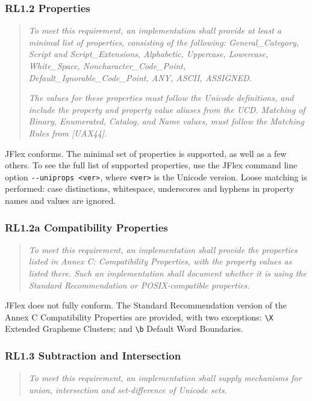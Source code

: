 \documentclass[11pt]{scrartcl}
\begin{document}
\subsubsection*{RL1.2 Properties}

\begin{quote}
\emph{To meet this requirement, an implementation shall provide at least a
minimal list of properties, consisting of the following: General\_Category,
Script and Script\_Extensions, Alphabetic, Uppercase, Lowercase, White\_Space,
Noncharacter\_Code\_Point, Default\_Ignorable\_Code\_Point, ANY, ASCII, ASSIGNED.}

\emph{The values for these properties must follow the Unicode definitions, 
and include the property and property value aliases from the UCD. Matching
of Binary, Enumerated, Catalog, and Name values, must follow the
Matching Rules from [UAX44].}
\end{quote}

JFlex conforms.  The minimal set of properties is supported, as well as
a few others. To see the full list of supported properties, use the JFlex
command line option \verb+--uniprops <ver>+, where \verb+<ver>+ is the
Unicode version.  Loose matching is performed: case distinctions, 
whitespace, underscores and hyphens in property names and values are
ignored.

\subsubsection*{RL1.2a Compatibility Properties}

\begin{quote}
\emph{To meet this requirement, an implementation shall provide the properties
listed in Annex C: Compatibility Properties, with the property values as
listed there. Such an implementation shall document whether it is using
the Standard Recommendation or POSIX-compatible properties.}
\end{quote}

JFlex does not fully conform. The Standard Recommendation version of the
Annex C Compatibility Properties are provided, with two exceptions:
\verb+\X+ Extended Grapheme Clusters; and \verb+\b+ Default Word
Boundaries.

\subsubsection*{RL1.3 Subtraction and Intersection}

\begin{quote}
\emph{To meet this requirement, an implementation shall supply mechanisms for
union, intersection and set-difference of Unicode sets.}
\end{quote}
\end{document}
